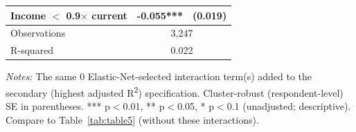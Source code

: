\begin{table}[H]
\begin{tabular}{ l c c }
\hspace{0.05cm} Income $<$ 0.9$\times$ current & -0.055*** & (0.019) \\
\hline
\hspace{0.05cm} Observations & \multicolumn{2}{c}{3,247} \\
\hspace{0.05cm} R-squared & \multicolumn{2}{c}{0.022} \\
\hline \hline
\end{tabular}
\begin{tablenotes}
\small
\item \textit{Notes:} The same 0 Elastic-Net-selected interaction term(s) added to the secondary (highest adjusted R\textsuperscript{2}) specification. Cluster-robust (respondent-level) SE in parentheses. *** p$<$0.01, ** p$<$0.05, * p$<$0.1 (unadjusted; descriptive). Compare to Table~\ref{tab:table5} (without these interactions).
\end{tablenotes}
    \label{tab:table8}
\end{table}
